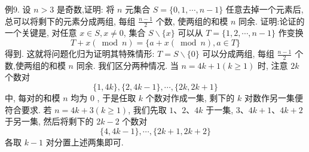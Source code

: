例9. 设 $n>3$ 是奇数,证明: 将 $n$ 元集合 $S=\{0,1, \cdots, n-1\}$ 任意去掉一个元素后, 总可以将剩下的元素分成两组, 每组 $\frac{n-1}{2}$ 个数, 使两组的和模 $n$ 同余.
证明:论证的一个关键是, 对任意 $x \in S, x \neq 0$, 集合 $S \backslash\{x\}$ 可以从 $T= \{1,2, \cdots, n-1\}$ 作变换
$$
T+x(\bmod n)=\{a+x(\bmod n), a \in T\}
$$
得到.
这就将问题化归为证明其特殊情形: $T=S \backslash\{0\}$ 可以分成两组, 每组 $\frac{n-1}{2}$ 个数,使两组的和模 $n$ 同余.
我们区分两种情况.
当 $n=4 k+1(k \geqslant 1)$ 时, 注意 $2 k$ 个数对
$$
\{1,4 k\},\{2,4 k-1\}, \cdots,\{2 k, 2 k+1\}
$$
中, 每对的和模 $n$ 均为 0 , 于是任取 $k$ 个数对作成一集, 剩下的 $k$ 对数作另一集便符合要求.
若 $n=4 k+3(k \geqslant 1)$, 我们先取 $1 、 2 、 4 k$ 于一集, $3 、 4 k+1 、 4 k+2$ 于另一集, 然后将剩下的 $2 k-2$ 个数对
$$
\{4,4 k-1\}, \cdots,\{2 k+1,2 k+2\}
$$
各取 $k-1$ 对分置上述两集即可.



